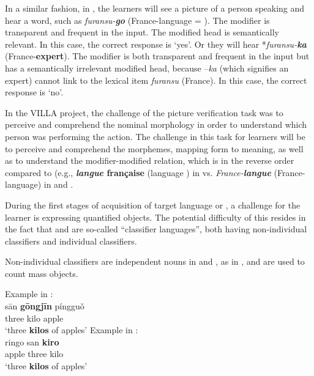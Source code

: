 \documentclass[output=paper,colorlinks,citecolor=brown,modfonts,nonflat]{../langscibook}
\begin{document}
\largerpage[-1]
In a similar fashion, in , the learners will see a picture of a person speaking  and hear a word, such as \textit{furansu-}\textbf{\textit{go}} (France-language = ). The modifier is transparent and frequent in the input. The modified head is semantically relevant. In this case, the correct response is ‘yes’. Or they will hear *\textit{furansu-}\textbf{\textit{ka}} (France-\textbf{expert}). The modifier is both transparent and frequent in the input but has a semantically irrelevant modified head, because –\textit{ka} (which signifies an expert) cannot link to the lexical item \textit{furansu} (France). In this case, the correct response is ‘no’.

In the VILLA project, the challenge of the picture verification task was to perceive and comprehend the nominal morphology in order to understand which person was performing the action. The challenge in this task for  learners will be to perceive and comprehend the morphemes, mapping form to meaning, as well as to understand the modifier-modified relation, which is in the reverse order compared to  (e.g., \textbf{\textit{langue} française} (language ) in  vs. \textit{France-}\textbf{\textit{langue}} (France-language) in  and .

\label{sec:watorek:4.2.2.2.2}

During the first stages of acquisition of target language  or , a challenge for the  learner is expressing quantified objects. The potential difficulty of this resides in the fact that  and  are so-called “classifier languages”, both having non-individual classifiers and individual classifiers.


Non-individual classifiers are independent nouns in   and  , as in , and are used to count mass objects.

\ea%
    \label{ex:watorek:12}
    \ea%
    \label{ex:watorek:12a}
    Example in :\\
    \gll    sān \textbf{{gōngjīn}} píngguǒ\\
            three  {kilo} apple\\
    \glt    ‘three \textbf{kilos} of apples’
    \ex%
    \label{ex:watorek:12b}
    Example in :\\
    \gll    ringo san \textbf{\textbf{kiro}}\\
            apple three  {kilo}\\
    \glt    ‘three \textbf{{kilos}} of apples’
    \z
\z
\end{document}
